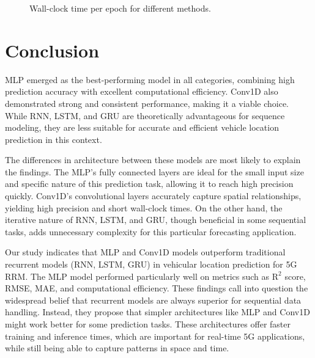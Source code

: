 \documentclass[conference]{IEEEtran}
\begin{document}
{\begin{figure}
        \centering
        
        \caption{Wall-clock time per epoch for different methods.}
        \label{fig:exec-time-over-epochs}
        \vspace{-4mm}
\end{figure}

\section{Conclusion} \label{discussions}
MLP emerged as the best-performing model in all categories, combining high prediction accuracy with excellent computational efficiency. Conv1D also demonstrated strong and consistent performance, making it a viable choice. While RNN, LSTM, and GRU are theoretically advantageous for sequence modeling, they are less suitable for accurate and efficient vehicle location prediction in this context.

The differences in architecture between these models are most likely to explain the findings. The MLP's fully connected layers are ideal for the small input size and specific nature of this prediction task, allowing it to reach high precision quickly. Conv1D's convolutional layers accurately capture spatial relationships, yielding high precision and short wall-clock times. On the other hand, the iterative nature of RNN, LSTM, and GRU, though beneficial in some sequential tasks, adds unnecessary complexity for this particular forecasting application. 

Our study indicates that MLP and Conv1D models outperform traditional recurrent models (RNN, LSTM, GRU) in vehicular location prediction for 5G RRM. The MLP model performed particularly well on metrics such as $\text{R}^2$ score, RMSE, MAE, and computational efficiency. These findings call into question the widespread belief that recurrent models are always superior for sequential data handling. Instead, they propose that simpler architectures like MLP and Conv1D might work better for some prediction tasks. These architectures offer faster training and inference times, which are important for real-time 5G applications, while still being able to capture patterns in space and time.

}
\end{document}
